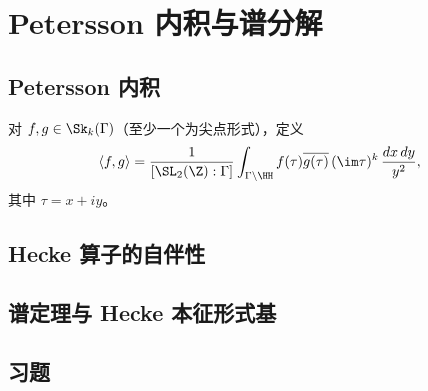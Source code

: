 \chapter{Petersson 内积与谱分解}
\label{ch:petersson-inner-product}

\section{Petersson 内积}

\begin{definition}[Petersson 内积]
对 $f, g \in \Sk_k(\Gamma)$（至少一个为尖点形式），定义
\[
  \langle f, g \rangle = \frac{1}{[\SL_2(\Z):\Gamma]}
  \int_{\Gamma \backslash \HH} f(\tau) \overline{g(\tau)}\, (\im \tau)^k
  \, \frac{dx\,dy}{y^2},
\]
其中 $\tau = x + iy$。
\end{definition}


\section{Hecke 算子的自伴性}


\section{谱定理与 Hecke 本征形式基}


\section{习题}

